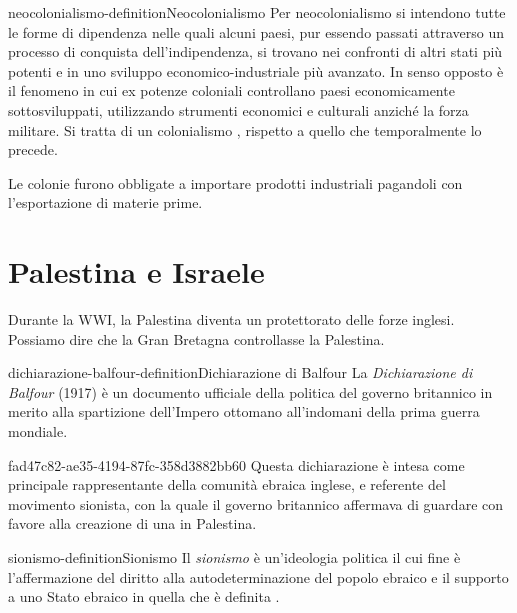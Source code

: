\documentclass[preview]{standalone}
\begin{document}
\begin{snippetdefinition}{neocolonialismo-definition}{Neocolonialismo}
    Per neocolonialismo si intendono tutte le forme di dipendenza nelle quali alcuni paesi,
    pur essendo passati attraverso un processo di conquista dell'indipendenza,
    si trovano nei confronti di altri stati più potenti e in uno
    sviluppo economico-industriale più avanzato.
    In senso opposto è il fenomeno in cui ex potenze coloniali controllano paesi
    economicamente sottosviluppati, utilizzando strumenti economici e
    culturali anziché la forza militare.
    Si tratta di un colonialismo ,
    rispetto a quello  che temporalmente lo precede.
\end{snippetdefinition}

\begin{plainhtml}
    Le colonie furono obbligate a importare prodotti industriali
    pagandoli con l'esportazione di materie prime.
\end{plainhtml}


\section{Palestina e Israele}

\begin{plainhtml}
    Durante la WWI, la Palestina diventa un protettorato delle forze inglesi.
    Possiamo dire che la Gran Bretagna controllasse la Palestina.
\end{plainhtml}

\begin{snippetdefinition}{dichiarazione-balfour-definition}{Dichiarazione di Balfour}
    La \textit{Dichiarazione di Balfour} (1917) è un documento ufficiale della politica del
    governo britannico in merito alla spartizione dell'Impero
    ottomano all'indomani della prima guerra mondiale.
\end{snippetdefinition}

\begin{snippet}{fad47c82-ae35-4194-87fc-358d3882bb60}
    Questa dichiarazione è intesa come principale rappresentante della
    comunità ebraica inglese, e referente del movimento
    sionista, con la quale il governo britannico affermava di guardare
    con favore alla creazione di una  in Palestina.
\end{snippet}

\begin{snippetdefinition}{sionismo-definition}{Sionismo}
    Il \textit{sionismo} è un'ideologia politica il cui fine è l'affermazione del
    diritto alla autodeterminazione del popolo ebraico e il supporto a uno
    Stato ebraico in quella che è definita .
\end{snippetdefinition}
\end{document}
